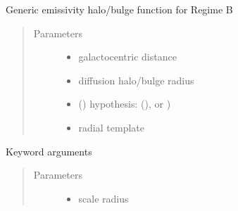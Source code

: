 \documentclass[letterpaper,10pt,english]{sphinxmanual}
\begin{document}

\begin{fulllineitems}
\label{\detokenize{diffsph.profiles:diffsph.profiles.hfactors.Hem_B}}
\sphinxAtStartPar
Generic emissivity halo/bulge function for Regime B
\begin{quote}\begin{description}
\item[{Parameters}] \leavevmode\begin{itemize}
\item {} 
\sphinxAtStartPar
{} \textendash{} galactocentric distance

\item {} 
\sphinxAtStartPar
{} \textendash{} diffusion halo/bulge radius

\item {} 
\sphinxAtStartPar
{} () \textendash{} hypothesis:  (),  or )

\item {} 
\sphinxAtStartPar
{} \textendash{} radial template

\end{itemize}

\end{description}\end{quote}

\sphinxAtStartPar
Keyword arguments
\begin{quote}\begin{description}
\item[{Parameters}] \leavevmode\begin{itemize}
\item {} 
\sphinxAtStartPar
{} \textendash{} scale radius


\end{itemize}
\end{description}
\end{quote}
\end{fulllineitems}
\end{document}
